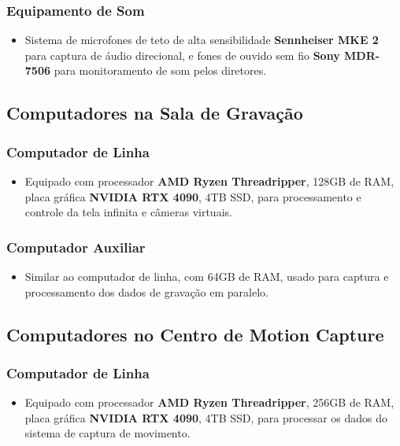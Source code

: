 \subsubsection{Equipamento de Som}
\begin{itemize}
    \item Sistema de microfones de teto de alta sensibilidade \textbf{Sennheiser MKE 2} para captura de áudio direcional, e fones de ouvido sem fio \textbf{Sony MDR-7506} para monitoramento de som pelos diretores.
\end{itemize}

\subsection{Computadores na Sala de Gravação}

\subsubsection{Computador de Linha}
\begin{itemize}
    \item Equipado com processador \textbf{AMD Ryzen Threadripper}, 128GB de RAM, placa gráfica \textbf{NVIDIA RTX 4090}, 4TB SSD, para processamento e controle da tela infinita e câmeras virtuais.
\end{itemize}

\subsubsection{Computador Auxiliar}
\begin{itemize}
    \item Similar ao computador de linha, com 64GB de RAM, usado para captura e processamento dos dados de gravação em paralelo.
\end{itemize}

\subsection{Computadores no Centro de Motion Capture}

\subsubsection{Computador de Linha}
\begin{itemize}
    \item Equipado com processador \textbf{AMD Ryzen Threadripper}, 256GB de RAM, placa gráfica \textbf{NVIDIA RTX 4090}, 4TB SSD, para processar os dados do sistema de captura de movimento.
\end{itemize}

